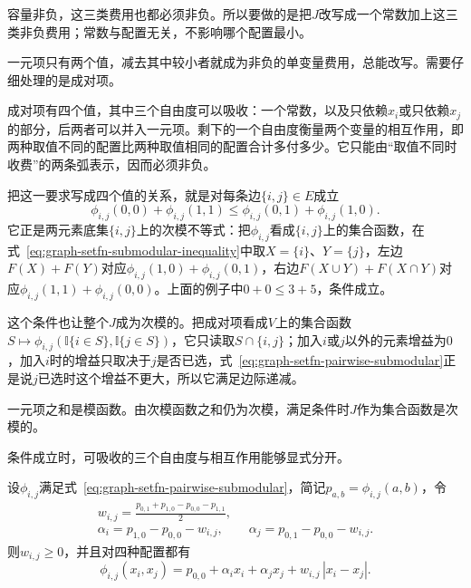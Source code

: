 容量非负，这三类费用也都必须非负。所以要做的是把$J$改写成一个常数加上这三类非负费用；常数与配置无关，不影响哪个配置最小。

一元项只有两个值，减去其中较小者就成为非负的单变量费用，总能改写。需要仔细处理的是成对项。

成对项有四个值，其中三个自由度可以吸收：一个常数，以及只依赖$x_i$或只依赖$x_j$的部分，后两者可以并入一元项。剩下的一个自由度衡量两个变量的相互作用，即两种取值不同的配置比两种取值相同的配置合计多付多少。它只能由“取值不同时收费”的两条弧表示，因而必须非负。

把这一要求写成四个值的关系，就是对每条边$\{i,j\}\in E$成立
\begin{equation}
  \phi_{i,j}(0,0)+\phi_{i,j}(1,1)\leq\phi_{i,j}(0,1)+\phi_{i,j}(1,0).
  \label{eq:graph-setfn-pairwise-submodular}
\end{equation}
它正是两元素底集$\{i,j\}$上的次模不等式：把$\phi_{i,j}$看成$\{i,j\}$上的集合函数，在式~\eqref{eq:graph-setfn-submodular-inequality}中取$X=\{i\}$、$Y=\{j\}$，左边$F(X)+F(Y)$对应$\phi_{i,j}(1,0)+\phi_{i,j}(0,1)$，右边$F(X\cup Y)+F(X\cap Y)$对应$\phi_{i,j}(1,1)+\phi_{i,j}(0,0)$。上面的例子中$0+0\leq3+5$，条件成立。

这个条件也让整个$J$成为次模的。把成对项看成$V$上的集合函数$S\mapsto\phi_{i,j}(\mathbb I\{i\in S\},\mathbb I\{j\in S\})$，它只读取$S\cap\{i,j\}$；加入$i$或$j$以外的元素增益为$0$，加入$i$时的增益只取决于$j$是否已选，式~\eqref{eq:graph-setfn-pairwise-submodular}正是说$j$已选时这个增益不更大，所以它满足边际递减。

一元项之和是模函数。由次模函数之和仍为次模，满足条件时$J$作为集合函数是次模的。

条件成立时，可吸收的三个自由度与相互作用能够显式分开。

\begin{lemma}[成对项的分解]
\label{lem:graph-setfn-pairwise-decomposition}
设$\phi_{i,j}$满足式~\eqref{eq:graph-setfn-pairwise-submodular}，简记$p_{a,b}=\phi_{i,j}(a,b)$，令
\[
  \begin{gathered}
  w_{i,j}=\frac{p_{0,1}+p_{1,0}-p_{0,0}-p_{1,1}}{2},\\
  \alpha_i=p_{1,0}-p_{0,0}-w_{i,j},\qquad
  \alpha_j=p_{0,1}-p_{0,0}-w_{i,j}.
  \end{gathered}
\]
则$w_{i,j}\geq0$，并且对四种配置都有
\begin{equation}
  \phi_{i,j}(x_i,x_j)=p_{0,0}+\alpha_ix_i+\alpha_jx_j+w_{i,j}\,|x_i-x_j|.
  \label{eq:graph-setfn-pairwise-decomposition}
\end{equation}
\end{lemma}

